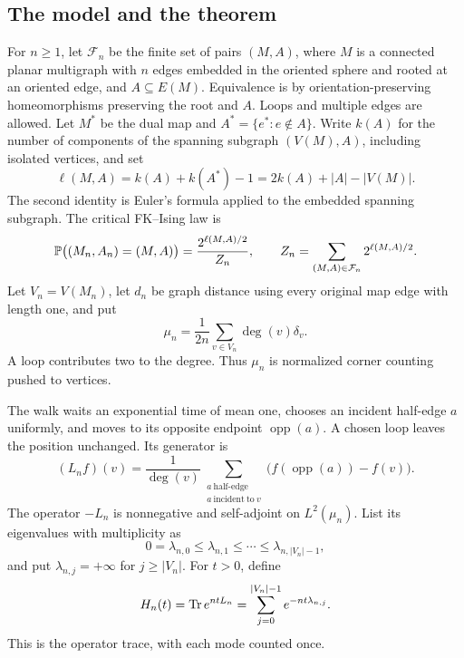 \subsection{The model and the theorem}

For \(n\ge1\), let \(\mathcal F_n\) be the finite set of pairs \((M,A)\),
where \(M\) is a connected planar multigraph with \(n\) edges embedded in the
oriented sphere and rooted at an oriented edge, and \(A\subseteq E(M)\).
Equivalence is by orientation-preserving homeomorphisms preserving the root
and \(A\).  Loops and multiple edges are allowed.  Let \(M^*\) be the dual
map and \(A^*=\{e^*:e\notin A\}\).  Write \(k(A)\) for the number of
components of the spanning subgraph \((V(M),A)\), including isolated
vertices, and set
\[
 \ell(M,A)=k(A)+k(A^*)-1=2k(A)+|A|-|V(M)|.
\]
The second identity is Euler's formula applied to the embedded spanning
subgraph.  The critical FK--Ising law is
\begin{equation}\label{eq:fk-law}
 \mathbb P\bigl((M_n,A_n)=(M,A)\bigr)=\frac{2^{\ell(M,A)/2}}{Z_n},
 \qquad
 Z_n=\sum_{(M,A)\in\mathcal F_n}2^{\ell(M,A)/2}.
\end{equation}
Let \(V_n=V(M_n)\), let \(d_n\) be graph distance using every original map
edge with length one, and put
\begin{equation}\label{eq:corner-measure}
 \mu_n=\frac1{2n}\sum_{v\in V_n}\deg(v)\delta_v .
\end{equation}
A loop contributes two to the degree.  Thus \(\mu_n\) is normalized corner
counting pushed to vertices.

The walk waits an exponential time of mean one, chooses an incident half-edge
\(a\) uniformly, and moves to its opposite endpoint \(\operatorname{opp}(a)\).
A chosen loop leaves the position unchanged.  Its generator is
\begin{equation}\label{eq:walk-generator}
 (L_nf)(v)=\frac1{\deg(v)}
 \sum_{\substack{a\ \mathrm{half\text{-}edge}\\ a\ \mathrm{incident\ to}\ v}}
 \bigl(f(\operatorname{opp}(a))-f(v)\bigr).
\end{equation}
The operator \(-L_n\) is nonnegative and self-adjoint on \(L^2(\mu_n)\).
List its eigenvalues with multiplicity as
\[
 0=\lambda_{n,0}\le\lambda_{n,1}\le\cdots
 \le\lambda_{n,|V_n|-1},
\]
and put \(\lambda_{n,j}=+\infty\) for \(j\ge |V_n|\).  For \(t>0\), define
\begin{equation}\label{eq:discrete-heat-trace}
 H_n(t)=\operatorname{Tr} e^{ntL_n}
       =\sum_{j=0}^{|V_n|-1}e^{-nt\lambda_{n,j}}.
\end{equation}
This is the operator trace, with each mode counted once.

